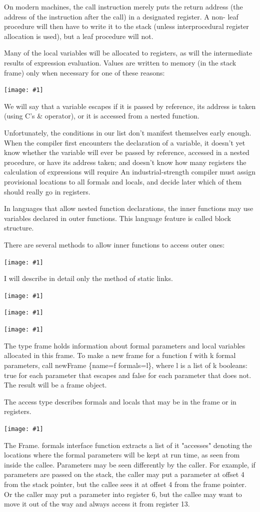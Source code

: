 \documentclass[8pt, a4paper, oneside, twocolumn]{extarticle}
\newcommand{\ph}[1]{
    \texttt{[image: \#1]}
}
\begin{document}
On modern machines, the call instruction merely puts the return address
(the address of the instruction after the call) in a designated register. A non-
leaf procedure will then have to write it to the stack (unless interprocedural
register allocation is used), but a leaf procedure will not.

Many of the local variables will be allocated to registers, as will the
intermediate results of expression evaluation. Values are written to memory
(in the stack frame) only when necessary for one of these reasons:

\ph{r12}

We will say that a variable escapes if it is passed by reference, its address
is taken (using C's \& operator), or it is accessed from a nested function.

Unfortunately, the conditions in our list don't manifest
themselves early enough. When the compiler first encounters the declaration
of a variable, it doesn't yet know whether the variable will ever be passed
by reference, accessed in a nested procedure, or have its address taken; and
doesn't know how many registers the calculation of expressions will require
An industrial-strength compiler must assign provisional locations
to all formals and locals, and decide later which of them should really go in registers.

In languages that allow nested function declarations, the inner functions may use variables declared in outer functions. This
language feature is called block structure.

There are several methods to allow inner functions to access outer ones:

\ph{r13}

I will describe in detail only the method of static links.

\ph{arpb}

\ph{r14}

\ph{r15}

The type frame holds information about formal parameters and local 
variables allocated in this frame. To make a new frame for a function f with k
formal parameters, call newFrame \{name=f formals=l\}, where l is a list
of k booleans: true for each parameter that escapes and false for each
parameter that does not. The result will be a frame object.

The access type describes formals and locals that may be in the frame or
in registers.

\ph{r16}

The Frame. formals interface function extracts a list of it "accesses" 
denoting the locations where the formal parameters will be kept at run time, as
seen from inside the callee. Parameters may be seen differently by the caller.
For example, if parameters are passed on the stack, the caller
may put a parameter at offset 4 from the stack pointer, but the callee sees it at
offset 4 from the frame pointer. Or the caller may put a parameter into register
6, but the callee may want to move it out of the way and always access it from register 13.
\end{document}
